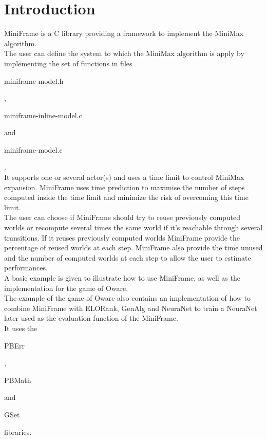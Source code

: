 \section*{Introduction}

MiniFrame is a C library providing a framework to implement the MiniMax algorithm.\\ 

The user can define the system to which the MiniMax algorithm is apply by implementing the set of functions in files \begin{ttfamily}miniframe-model.h\end{ttfamily}, \begin{ttfamily}miniframe-inline-model.c\end{ttfamily} and \begin{ttfamily}miniframe-model.c\end{ttfamily}.\\

It supports one or several actor(s) and uses a time limit to control MiniMax expansion. MiniFrame uses time prediction to maximise the number of steps computed inside the time limit and minimize the risk of overcoming this time limit.\\

The user can choose if MiniFrame should try to reuse previously computed worlds or recompute several times the same world if it's reachable through several transitions. If it reuses previously computed worlds MiniFrame provide the percentage of reused worlds at each step. MiniFrame also provide the time unused and the number of computed worlds at each step to allow the user to estimate performances.\\

A basic example is given to illustrate how to use MiniFrame, as well as the implementation for the game of Oware.\\

The example of the game of Oware also contains an implementation of how to combine MiniFrame with ELORank, GenAlg and NeuraNet to train a NeuraNet later used as the evaluation function of the MiniFrame.\\

It uses the \begin{ttfamily}PBErr\end{ttfamily}, \begin{ttfamily}PBMath\end{ttfamily} and \begin{ttfamily}GSet\end{ttfamily} libraries.\\

